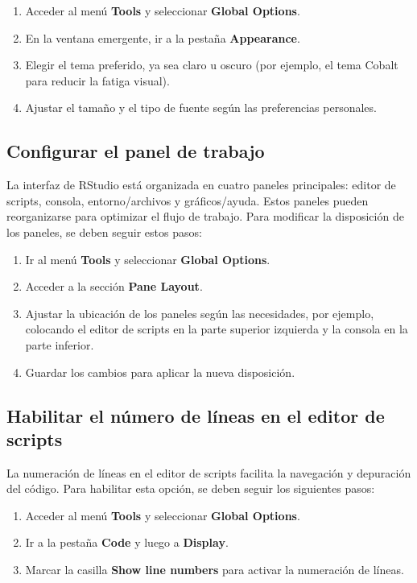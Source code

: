 \documentclass[
  spanish,
  a4paper,
  DIV=11,
  numbers=noendperiod,
  onepage,
  openany]{scrreprt}
\begin{document}
\begin{enumerate}
\def\labelenumi{\arabic{enumi}.}
\item
  Acceder al menú \textbf{Tools} y seleccionar \textbf{Global Options}.
\item
  En la ventana emergente, ir a la pestaña \textbf{Appearance}.
\item
  Elegir el tema preferido, ya sea claro u oscuro (por ejemplo, el tema
  Cobalt para reducir la fatiga visual).
\item
  Ajustar el tamaño y el tipo de fuente según las preferencias
  personales.
\end{enumerate}

\subsection{Configurar el panel de
trabajo}\label{configurar-el-panel-de-trabajo}

La interfaz de RStudio está organizada en cuatro paneles principales:
editor de scripts, consola, entorno/archivos y gráficos/ayuda. Estos
paneles pueden reorganizarse para optimizar el flujo de trabajo. Para
modificar la disposición de los paneles, se deben seguir estos pasos:

\begin{enumerate}
\def\labelenumi{\arabic{enumi}.}
\item
  Ir al menú \textbf{Tools} y seleccionar \textbf{Global Options}.
\item
  Acceder a la sección \textbf{Pane Layout}.
\item
  Ajustar la ubicación de los paneles según las necesidades, por
  ejemplo, colocando el editor de scripts en la parte superior izquierda
  y la consola en la parte inferior.
\item
  Guardar los cambios para aplicar la nueva disposición.
\end{enumerate}

\subsection{Habilitar el número de líneas en el editor de
scripts}\label{habilitar-el-nuxfamero-de-luxedneas-en-el-editor-de-scripts}

La numeración de líneas en el editor de scripts facilita la navegación y
depuración del código. Para habilitar esta opción, se deben seguir los
siguientes pasos:

\begin{enumerate}
\def\labelenumi{\arabic{enumi}.}
\item
  Acceder al menú \textbf{Tools} y seleccionar \textbf{Global Options}.
\item
  Ir a la pestaña \textbf{Code} y luego a \textbf{Display}.
\item
  Marcar la casilla \textbf{Show line numbers} para activar la
  numeración de líneas.
\end{enumerate}
\end{document}
